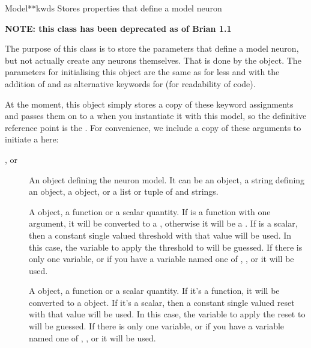 \documentclass[letterpaper,10pt,english]{manual}
\begin{document}
\hypertarget{brian.Model}{}\begin{classdesc}{Model}{**kwds}
Stores properties that define a model neuron

\textbf{NOTE: this class has been deprecated as of Brian 1.1}

The purpose of this class is to store the parameters that define
a model neuron, but not actually create any neurons themselves. That is
done by the \hyperlink{brian.NeuronGroup}{} object. The parameters for initialising
this object are the same as for \hyperlink{brian.NeuronGroup}{} less  and
with the addition of  and  as
alternative keywords for  (for readability of code).

At the moment, this object simply stores a copy of these keyword
assignments and passes them on to a \hyperlink{brian.NeuronGroup}{} when you
instantiate it with this model, so the definitive reference point is
the \hyperlink{brian.NeuronGroup}{}. For convenience, we include a copy of these
arguments to initiate a \hyperlink{brian.Model}{} here:
\begin{description}
\item[,  or ]
An object defining the neuron model. It can be
an \hyperlink{brian.Equations}{} object, a string defining an \hyperlink{brian.Equations}{} object,
a  object, or a list or tuple of \hyperlink{brian.Equations}{} and
strings.

\item[]
A \hyperlink{brian.Threshold}{} object, a function or a scalar quantity.
If  is a function with one argument, it will be
converted to a \hyperlink{brian.SimpleFunThreshold}{}, otherwise it will be a
\hyperlink{brian.FunThreshold}{}. If  is a scalar, then a constant
single valued threshold with that value will be used. In this case,
the variable to apply the threshold to will be guessed. If there is
only one variable, or if you have a variable named one of
, ,  or  it will be used.

\item[]
A \hyperlink{brian.Reset}{} object, a function or a scalar quantity. If it's a
function, it will be converted to a \hyperlink{brian.FunReset}{} object. If it's
a scalar, then a constant single valued reset with that value will
be used. In this case,
the variable to apply the reset to will be guessed. If there is
only one variable, or if you have a variable named one of
, ,  or  it will be used.


\end{description}
\end{classdesc}
\end{document}
